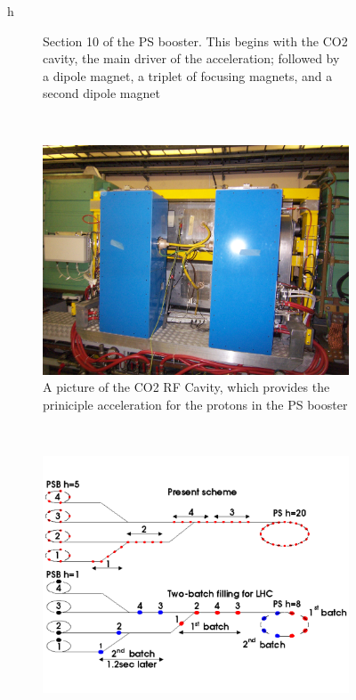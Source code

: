 \begin{figure}{h}
\begin{subfigure}[h]{0.4\textwidth}
        \caption{Section 10 of the PS booster.  This begins with the
          CO2 cavity, the main driver of the acceleration; followed by
        a dipole magnet, a triplet of focusing magnets, and a second
        dipole magnet}\label{fig:psbooster_section10}
      \end{subfigure}
      ~ %
      \begin{subfigure}[h]{0.4\textwidth}
        \includegraphics[width=\textwidth]{Figures/LHC_Diagrams/LHC__PSbooster__CO2_RFCavity__P10L1.JPG}
        \caption{A picture of the CO2 RF Cavity, which provides the
          priniciple acceleration for the protons in the PS booster}\label{fig:psbooster_CO2_RFCavity}
      \end{subfigure}
      ~ %
      \begin{subfigure}[h]{0.4\textwidth}
        \includegraphics[width=\textwidth]{Figures/LHC_Diagrams/LHC__PSbooster__2batchFillingScheme__schindlrf.pdf}

\end{subfigure}
\end{figure}
